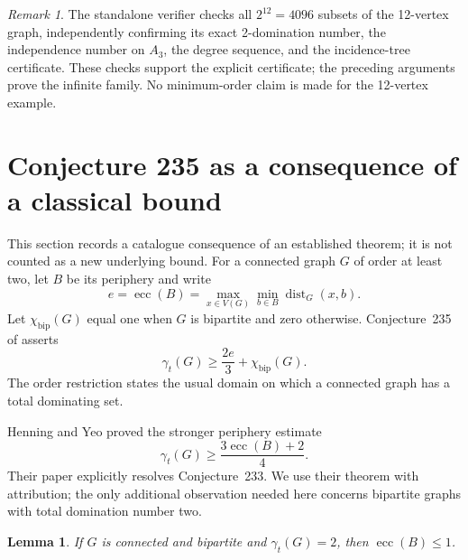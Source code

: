 \documentclass[11pt,a4paper]{article}
\newtheorem{lemma}[theorem]{Lemma}
\theoremstyle{remark}
\newtheorem{remark}[theorem]{Remark}
\begin{document}
\begin{remark}
The standalone verifier checks all $2^{12}=4096$ subsets of the
12-vertex graph, independently confirming its exact 2-domination
number, the independence number on $A_3$, the degree sequence, and
the incidence-tree certificate. These checks support the explicit
certificate; the preceding arguments prove the infinite family.
No minimum-order claim is made for the 12-vertex example.
\end{remark}


\section{Conjecture 235 as a consequence of a classical bound}
\label{r6:sec235}

This section records a catalogue consequence of an established theorem;
it is not counted as a new underlying bound.  For a connected graph $G$
of order at least two, let $B$ be its periphery and write
\[
 e=\operatorname{ecc}(B)
   =\max_{x\in V(G)}\min_{b\in B}\operatorname{dist}_G(x,b).
\]
Let $\chi_{\mathrm{bip}}(G)$ equal one when $G$ is bipartite and zero
otherwise.  Conjecture~235 of \cite{WOWII} asserts
\begin{equation}
 \gamma_t(G)\ge \frac{2e}{3}+\chi_{\mathrm{bip}}(G).
 \label{r6:235-assertion}
\end{equation}
The order restriction states the usual domain on which a connected graph
has a total dominating set.

Henning and Yeo \cite{HY14} proved the stronger periphery estimate
\begin{equation}
 \gamma_t(G)\ge\frac{3\operatorname{ecc}(B)+2}{4}.
 \label{r6:235-HY}
\end{equation}
Their paper explicitly resolves Conjecture~233.  We use their theorem
with attribution; the only additional observation needed here concerns
bipartite graphs with total domination number two.

\begin{lemma}
\label{r6:235-bipartite-pair}
If $G$ is connected and bipartite and $\gamma_t(G)=2$, then
$\operatorname{ecc}(B)\le1$.
\end{lemma}
\end{document}
